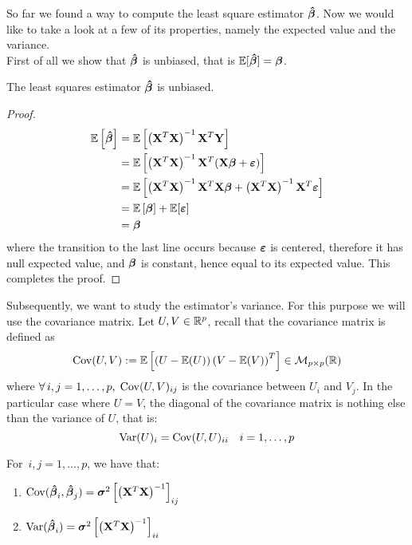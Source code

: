 So far we found a way to compute the least square estimator \(\boldsymbol{\hat{\beta}}\). Now we would like to take a look at a few of its properties, namely the expected value and the variance. \\
First of all we show that \(\boldsymbol{\hat{\beta}}\) is unbiased, that is $\mathbb{E} [\boldsymbol{\hat{\beta}}] = \boldsymbol{\beta}$.
\begin{proposition}
    The least squares estimator \(\boldsymbol{\hat{\beta}}\) is unbiased.
\end{proposition}
\begin{proof}
    \begin{align*}
        \mathbb{E} \left[ \boldsymbol{\hat{\beta}} \right]
         & = \mathbb{E} \left[ \left(\mathbf{X}^{T} \mathbf{X} \right)^{-1} \mathbf{X}^{T} \mathbf{Y} \right]                                                \\
         & = \mathbb{E} \left[ \left(\mathbf{X}^{T} \mathbf{X} \right)^{-1} \mathbf{X}^{T}(\mathbf{X} \boldsymbol{\beta} + \boldsymbol{\varepsilon})\right]                                    \\
         & = \mathbb{E} \left[ \left(\mathbf{X}^{T} \mathbf{X} \right)^{-1} \mathbf{X}^{T} \mathbf{X} \boldsymbol{\beta} + \left(\mathbf{X}^{T} \mathbf{X}\right)^{-1} \mathbf{X}^{T} \boldsymbol{\varepsilon} \right] \\
         & = \mathbb{E} \left[ \boldsymbol{\beta} \right] + \mathbb{E} [\boldsymbol{\varepsilon}]                                                                      \\
         & = \boldsymbol{\beta}
    \end{align*}
    where the transition to the last line occurs because \(\boldsymbol{\varepsilon}\) is centered, therefore it has null expected value, and \(\boldsymbol{\beta}\) is constant, hence equal to its expected value. This completes the proof.

\end{proof}
Subsequently, we want to study the estimator's variance. For this purpose we will use the covariance matrix. Let \(U, V \in \mathbb{R}^p\), recall that the covariance matrix is defined as
\[
    \operatorname{Cov} (U, V) := \mathbb{E} \left[ \left( U - \mathbb{E} (U) \right) \left( V - \mathbb{E} (V) \right)^T \right] \in \mathcal{M}_{p \times p}(\mathbb{R})
\]
where \(\forall \, i, j = 1, \ldots, p, \; \operatorname{Cov} (U, V)_{ij}\) is the covariance between \( U_i \) and \( V_j\). In the particular case where \( U = V \), the diagonal of the covariance matrix is nothing else than the variance of \( U \), that is:
\[
    \operatorname{Var} (U)_i = \operatorname{Cov} (U, U)_{ii} \quad i = 1, \ldots, p
\]
\begin{proposition}
    For \( \, i, j = 1, \ldots, p\), we have that:
    \begin{enumerate}[label=(\roman*)]
        \item \(\operatorname{Cov} (\boldsymbol{\hat{\beta}}_i, \boldsymbol{\hat{\beta}}_j) = \boldsymbol{\sigma}^{2} \left[ \left( \mathbf{X}^T \mathbf{X} \right)^{-1} \right]_{ij}\)
        \item \(\operatorname{Var} (\boldsymbol{\hat{\beta}}_i) = \boldsymbol{\sigma}^{2} \left[ \left( \mathbf{X}^T \mathbf{X} \right)^{-1} \right]_{ii}\)
    \end{enumerate}
\end{proposition}
